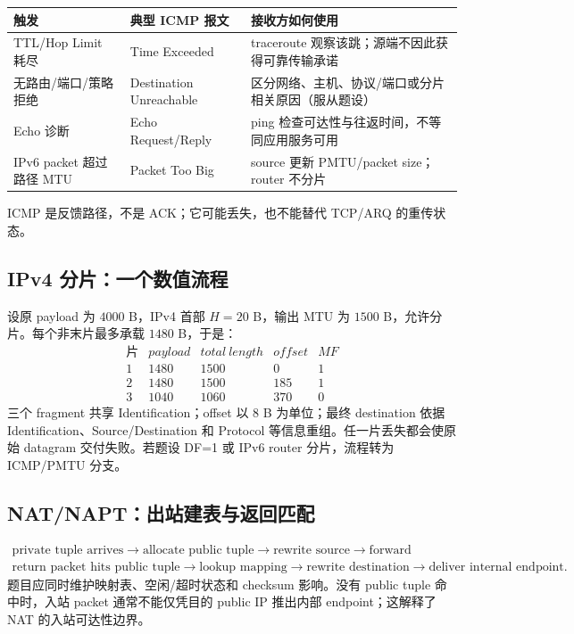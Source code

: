\documentclass[11pt,a4paper]{ctexart}
\begin{document}
\begin{center}\small
\begin{tabularx}{\linewidth}{L{3.2cm}Y Y}
\toprule
触发 & 典型 ICMP 报文 & 接收方如何使用\\
\midrule
TTL/Hop Limit 耗尽 & Time Exceeded & traceroute 观察该跳；源端不因此获得可靠传输承诺\\
无路由/端口/策略拒绝 & Destination Unreachable & 区分网络、主机、协议/端口或分片相关原因（服从题设）\\
Echo 诊断 & Echo Request/Reply & ping 检查可达性与往返时间，不等同应用服务可用\\
IPv6 packet 超过路径 MTU & Packet Too Big & source 更新 PMTU/packet size；router 不分片\\
\bottomrule
\end{tabularx}\end{center}
ICMP 是反馈路径，不是 ACK；它可能丢失，也不能替代 TCP/ARQ 的重传状态。

\subsection{IPv4 分片：一个数值流程}

设原 payload 为 $4000$ B，IPv4 首部 $H=20$ B，输出 MTU 为 $1500$ B，允许分片。每个非末片最多承载 $1480$ B，于是：
\[
\begin{array}{c|c|c|c|c}
片 & payload & total\ length & offset & MF\\\hline
1&1480&1500&0&1\\
2&1480&1500&185&1\\
3&1040&1060&370&0
\end{array}
\]
三个 fragment 共享 Identification；offset 以 8 B 为单位；最终 destination 依据 Identification、Source/Destination 和 Protocol 等信息重组。任一片丢失都会使原始 datagram 交付失败。若题设 DF=1 或 IPv6 router 分片，流程转为 ICMP/PMTU 分支。

\subsection{NAT/NAPT：出站建表与返回匹配}

\[
\begin{gathered}
\text{private tuple arrives}\to\text{allocate public tuple}\to\text{rewrite source}\to\text{forward}\\
\text{return packet hits public tuple}\to\text{lookup mapping}\to\text{rewrite destination}\to\text{deliver internal endpoint}.
\end{gathered}
\]
题目应同时维护映射表、空闲/超时状态和 checksum 影响。没有 public tuple 命中时，入站 packet 通常不能仅凭目的 public IP 推出内部 endpoint；这解释了 NAT 的入站可达性边界。
\end{document}
